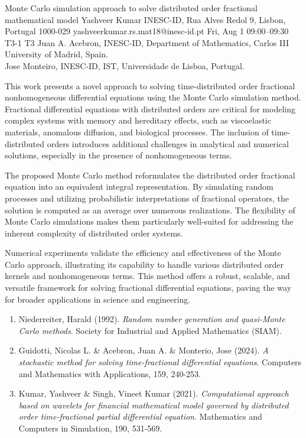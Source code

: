 \begin{talk}
  {Monte Carlo simulation approach to solve distributed order fractional mathematical model}%
  {Yashveer Kumar}%
  {INESC-ID, Rua Alves Redol 9, Lisbon, Portugal 1000-029}%
  {yashveerkumar.rs.mat18@inesc-id.pt}%
  {}%
  {}%
  {Fri, Aug 1 09:00--09:30}%
  {T3-1}%
  {T3}%
  {Juan A. Acebron, INESC-ID,  Department of Mathematics, Carlos III University of Madrid, Spain.\\
   Jose Monteiro, INESC-ID, IST, Universidade de Lisboa, Portugal.}%
    
   
   
This work presents a novel approach to solving time-distributed order fractional nonhomogeneous differential equations using the Monte Carlo simulation method. Fractional differential equations with distributed orders are critical for modeling complex systems with memory and hereditary effects, such as viscoelastic materials, anomalous diffusion, and biological processes. The inclusion of time-distributed orders introduces additional challenges in analytical and numerical solutions, especially in the presence of nonhomogeneous terms.

The proposed Monte Carlo method reformulates the distributed order fractional equation into an equivalent integral representation. By simulating random processes and utilizing probabilistic interpretations of fractional operators, the solution is computed as an average over numerous realizations. The flexibility of Monte Carlo simulations makes them particularly well-suited for addressing the inherent complexity of distributed order systems.

Numerical experiments validate the efficiency and effectiveness of the Monte Carlo approach, illustrating its capability to handle various distributed order kernels and nonhomogeneous terms. This method offers a robust, scalable, and versatile framework for solving fractional differential equations, paving the way for broader applications in science and engineering.

\medskip
\begin{enumerate}
 \item[{[1]}] Niederreiter, Harald (1992). {\it Random number generation and quasi-Monte Carlo methods}. Society for Industrial and Applied Mathematics (SIAM).
 \item[{[2]}] Guidotti, Nicolas L. \& Acebron, Juan A.  \&  Monterio, Jose (2024). {\it A stochastic method for solving time-fractional differential equations}. Computers and Mathematics with Applications, 159, 240-253.
 \item[{[3]}] Kumar, Yashveer \& Singh, Vineet Kumar (2021). {\it Computational approach based on wavelets for financial mathematical model governed by distributed order time-fractional partial differential equation}. Mathematics and Computers in Simulation, 190, 531-569.
\end{enumerate}
\end{talk}

